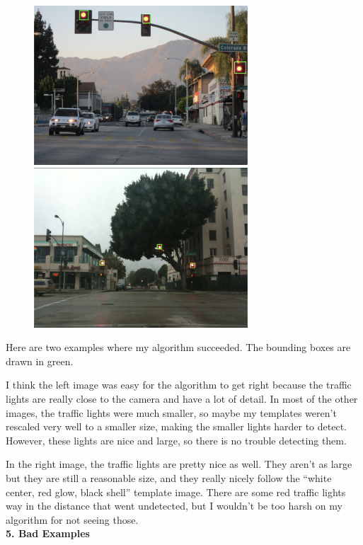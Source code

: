 \documentclass[12pt,letterpaper]{article} \usepackage{fullpage}
\begin{document}
\begin{figure}[htp]
    \centering
    \includegraphics[width=8cm]{img/good1.png}
    \includegraphics[width=8cm]{img/good2.png}
\end{figure}

Here are two examples where my algorithm succeeded.
The bounding boxes are drawn in green.

I think the left image was easy for the algorithm to get right because the traffic
lights are really close to the camera and have a lot of detail. In most of the other
images, the traffic lights were much smaller, so maybe my templates weren't rescaled
very well to a smaller size, making the smaller lights harder to detect. However, these
lights are nice and large, so there is no trouble detecting them.

In the right image, the traffic lights are pretty nice as well. They aren't as large
but they are still a reasonable size, and they really nicely follow the
``white center, red glow, black shell'' template image. There are some red traffic lights
way in the distance that went undetected, but I wouldn't be too harsh on
my algorithm for not seeing those.\\


\textbf{5. Bad Examples}
\end{document}
